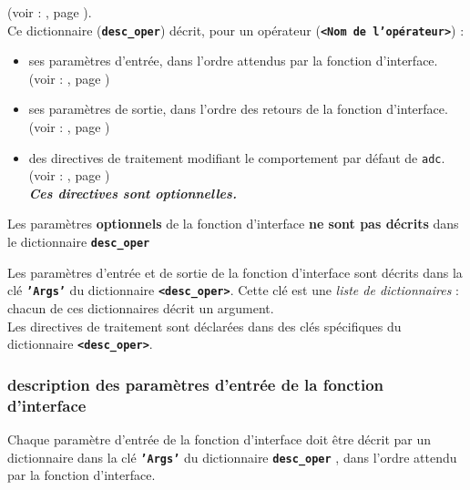   (voir : , page \pageref{sec:ex_fct_interface}). \\

  Ce dictionnaire (\textbf{\texttt{desc\_oper}}) décrit, pour un opérateur
  (\textbf{\texttt{<Nom de l'opérateur>}}) :
  \begin{itemize}
    \item[•] ses paramètres d'entrée, dans l'ordre attendus par la fonction
             d'interface. \\
             (voir : , page \pageref{sec:param_in})
    \item[•] ses paramètres de sortie, dans l'ordre des retours de la fonction
             d'interface. \\
             (voir : , page \pageref{sec:param_out})
    \item[•] des directives de traitement modifiant le comportement par défaut
             de \texttt{adc}. \\
             (voir : , page \pageref{sec:directives}) \\
             \textbf{\textit{Ces directives sont optionnelles. }}
  \end{itemize}
  \medbreak

  Les paramètres \textbf{optionnels} de la fonction d'interface
  \textbf{ne sont pas décrits} dans le dictionnaire
  \textbf{\texttt{desc\_oper}}
  \medbreak

  Les paramètres d'entrée et de sortie de la fonction d'interface sont décrits
  dans la clé \textbf{\texttt{'Args'}} du dictionnaire
  \textbf{\texttt{<desc\_oper>}}. Cette clé est une
  \textit{liste de dictionnaires} : chacun de ces dictionnaires décrit un
  argument. \\

  Les directives de traitement sont déclarées dans des clés spécifiques du
  dictionnaire \textbf{\texttt{<desc\_oper>}}.
  \medbreak

  \medbreak

\subsubsection{description des paramètres d'entrée de la fonction d'interface}
\label{sec:param_in}
Chaque paramètre d'entrée de la fonction d'interface doit être décrit par
un dictionnaire dans la clé \textbf{\texttt{'Args'}} du dictionnaire
\textbf{\texttt{desc\_oper}} , dans l'ordre attendu par la fonction
d'interface. \\

